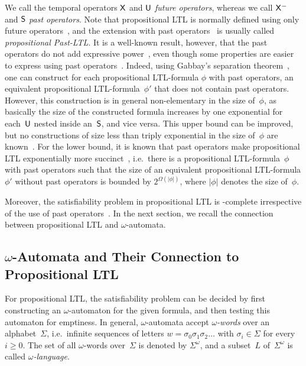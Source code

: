 \noindent
We call the temporal operators $\operatorname{\mathsf{X}}$ and $\mathbin{\mathsf{U}}$ \emph{future operators},
whereas we call $\Previous$ and $\mathbin{\mathsf{S}}$ \emph{past operators}.
%
Note that propositional LTL is normally defined using only future
operators~\cite{Pnu-FOCS77}, and the extension with past
operators~\cite{GPS+-POPL80} is usually called \emph{propositional Past-LTL}.
It is a well-known result, however, that the past operators do not add
expressive power~\cite{GPS+-POPL80}, even though some properties are easier to
express using past operators~\cite{LiPZ-CLP85}.  Indeed, using Gabbay's
separation theorem~\cite{Gab-TLS87}, one can construct for each propositional
LTL-formula $\phi$ with past operators, an equivalent propositional
LTL-formula~$\phi'$ that does not contain past operators.  However, this
construction is in general non-elementary in the size of~$\phi$, as basically
the size of the constructed formula increases by one exponential for
each~$\mathbin{\mathsf{U}}$ nested inside an~$\mathbin{\mathsf{S}}$, and vice versa.  This upper bound can
be improved, but no constructions of size less than triply exponential in the
size of~$\phi$ are known~\cite{LaMS-LICS02}.  For the lower bound, it is known
that past operators make propositional LTL exponentially more
succinct~\cite{LaMS-LICS02}, i.e.~there is a propositional LTL-formula~$\phi$
with past operators such that the size of an equivalent propositional
LTL-formula $\phi'$ without past operators is bounded by
$2^{\Omega(\lvert\phi\rvert)}$, where $\lvert\phi\rvert$ denotes the size
of~$\phi$.

Moreover, the satisfiability problem in propositional LTL is \PSpace-complete
irrespective of the use of past operators~\cite{SiCl-JACM85,Mar-AI04}.
%
In the next section, we recall the connection between propositional LTL and
$\omega$-automata.


\subsection{\texorpdfstring{$\omega$}{Omega}-Automata and Their Connection to Propositional LTL}\label{sec:aut-for-ltl}

For propositional LTL, the satisfiability problem can be decided by first
constructing an $\omega$-automaton for the given formula, and then testing this
automaton for emptiness.
%
In general, $\omega$-automata accept \emph{$\omega$-words} over an
alphabet~$\Sigma$, i.e.~infinite sequences of letters
$w=\sigma_0\sigma_1\sigma_2\dots$ with $\sigma_i\in\Sigma$ for every $i\ge 0$.
The set of all $\omega$-words over~$\Sigma$ is denoted by $\Sigma^\omega$, and a
subset~$L$ of~$\Sigma^\omega$ is called \emph{$\omega$-language}.

